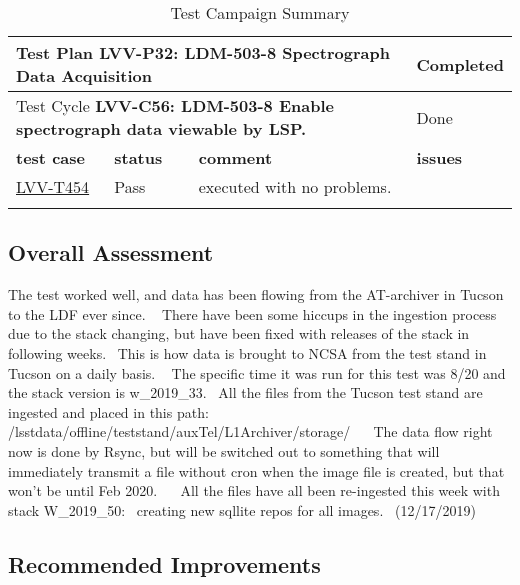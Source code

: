 \documentclass[DM,lsstdraft,STR,toc]{lsstdoc}
\begin{document}
\begin{longtable}{p{2cm}p{2.5cm}p{9cm}p{2.5cm}}
\toprule
\multicolumn{3}{l}{ Test Plan {\bf LVV-P32: LDM-503-8 Spectrograph Data Acquisition
 }} & Completed \\\hline

  \multicolumn{3}{l}{ Test Cycle {\bf LVV-C56: LDM-503-8 Enable spectrograph data viewable by LSP.
 }} & Done \\\hline

  {\bf \footnotesize test case} & {\bf \footnotesize status} & {\bf \footnotesize comment} & {\bf \footnotesize issues} \\\toprule

\href{https://jira.lsstcorp.org/secure/Tests.jspa#/testCase/LVV-T454}{LVV-T454}
    & Pass &
    \begin{minipage}[]{9cm}
    \smallskip
    executed with no problems.~

    \medskip
    \end{minipage}
    &
    \\\hline
\caption{Test Campaign Summary}
\label{table:summary}
\end{longtable}

\subsection{Overall Assessment}
\label{sect:overallassessment}

The test worked well, and data has been flowing from the AT-archiver in
Tucson to the LDF ever since. ~ There have been some hiccups in the
ingestion process due to the stack changing, but have been fixed with
releases of the stack in following weeks. ~This is how data is brought
to NCSA from the test stand in Tucson on a daily basis. ~ The specific
time it was run for this test was 8/20 and the stack version is
w\_2019\_33. ~All the files from the Tucson test stand are ingested and
placed in this path:
/lsstdata/offline/teststand/auxTel/L1Archiver/storage/ ~ ~The data flow
right now is done by Rsync, but will be switched out to something that
will immediately transmit a file without cron when the image file is
created, but that won't be until Feb 2020. ~ ~All the files have all
been re-ingested this week with stack W\_2019\_50: ~creating new sqllite
repos for all images. ~(12/17/2019)~


\subsection{Recommended Improvements}
\label{sect:recommendations}
\end{document}
